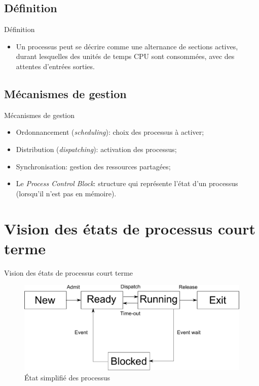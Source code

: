 \begin{frame}{\sectitle}

\def\subsectitle{Définition}
\subsection{\subsectitle}

\begin{exampleblock}{\subsectitle}
\begin{itemize}
    \item Un processus peut se décrire comme une alternance de sections actives,
    durant lesquelles des unités de temps CPU sont consommées, avec des attentes
    d'entrées sorties.
\end{itemize}
\end{exampleblock}

\def\subsectitle{Mécanismes de gestion}
\subsection{\subsectitle}

\begin{block}{\subsectitle}
\begin{itemize}
    \item Ordonnancement (\textit{scheduling}): choix des processus à activer;
    \item Distribution (\textit{dispatching}): activation des processus;
    \item Synchronisation: gestion des ressources partagées;
    \item Le \textit{Process Control Block}: structure qui représente l'état
    d'un processus (lorsqu'il n'est pas en mémoire).
\end{itemize}
\end{block}

\end{frame}




\def\sectitle{Vision des états de processus court terme}
\section{\sectitle}
\begin{frame}{\sectitle}
\begin{figure}
\includegraphics[width=.9\textwidth]{images/StateSimple.pdf}
\caption{État simplifié des processus}
\end{figure}
\end{frame}

